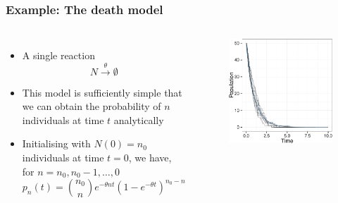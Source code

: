 \documentclass[t,compress]{beamer}
\begin{document}
\begin{frame}
\frametitle{Example: The death model}
\begin{columns}[c]
\begin{itemize}
\item A single reaction
\[
 N \xrightarrow{\theta} \emptyset
\]
\item This model is sufficiently simple that we can obtain the probability of $n$
  individuals at time $t$ analytically
\item Initialising with $N(0) = n_0$ individuals at time $t=0$, we have, for $n=n_0,n_{0}-1,\ldots, 0$
\[
  p_{n}(t)={n_0 \choose n}e^{-\theta n t}(1-e^{-\theta t})^{n_0-n}
\]


\end{itemize}
\begin{figure}[t]
\includegraphics[width=\textwidth]{figure2-crop.pdf} 
\end{figure}
\end{columns}
\end{frame}
\end{document}
